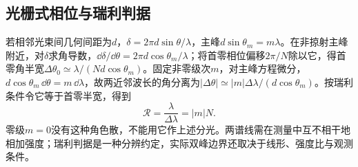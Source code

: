 \subsection{光栅式相位与瑞利判据}\label{th:o2resolution}
若相邻光束间几何间距为$d$，$\delta=2\pi d\sin\theta/\lambda$，主峰$d\sin\theta_m=m\lambda$。在非掠射主峰附近，对$\delta$求角导数，$\dd\delta/\dd\theta=2\pi d\cos\theta_m/\lambda$；将首零相位偏移$2\pi/N$除以它，得首零角半宽$\Delta\theta_0\simeq\lambda/(Nd\cos\theta_m)$。固定非零级次$m$，对主峰方程微分，$d\cos\theta_m\,\dd\theta=m\,\dd\lambda$，故两近邻波长的角分离为$|\Delta\theta|\simeq|m|\Delta\lambda/(d\cos\theta_m)$。按瑞利条件令它等于首零半宽，得到
\[
 \mathcal R=\frac\lambda{\Delta\lambda}=|m|N.
\]
零级$m=0$没有这种角色散，不能用它作上述分光。两谱线需在测量中互不相干地相加强度；瑞利判据是一种分辨约定，实际双峰边界还取决于线形、强度比与观测条件。

